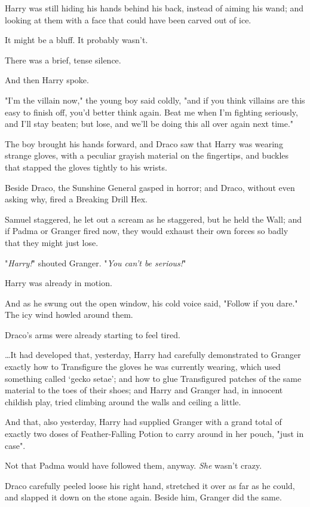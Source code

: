Harry was still hiding his hands behind his back, instead of aiming his wand; 
and looking at them with a face that could have been carved out of ice.

It might be a bluff. It probably wasn't.

There was a brief, tense silence.

And then Harry spoke.

"I'm the villain now," the young boy said coldly, "and if you think villains 
are this easy to finish off, you'd better think again. Beat me when I'm 
fighting seriously, and I'll stay beaten; but lose, and we'll be doing this all 
over again next time."

The boy brought his hands forward, and Draco saw that Harry was wearing strange 
gloves, with a peculiar grayish material on the fingertips, and buckles that 
stapped the gloves tightly to his wrists.

Beside Draco, the Sunshine General gasped in horror; and Draco, without even 
asking why, fired a Breaking Drill Hex.

Samuel staggered, he let out a scream as he staggered, but he held the Wall; 
and if Padma or Granger fired now, they would exhaust their own forces so badly 
that they might just lose.

"\emph{Harry!}" shouted Granger. "\emph{You can't be serious!}"

Harry was already in motion.

And as he swung out the open window, his cold voice said, "Follow if you dare."
\sbreak
The icy wind howled around them.

Draco's arms were already starting to feel tired.

{\ldots}It had developed that, yesterday, Harry had carefully demonstrated to 
Granger exactly how to Transfigure the gloves he was currently wearing, which 
used something called `gecko setae'; and how to glue Transfigured patches of 
the same material to the toes of their shoes; and Harry and Granger had, in 
innocent childish play, tried climbing around the walls and ceiling a little.

And that, also yesterday, Harry had supplied Granger with a grand total of 
exactly two doses of Feather-Falling Potion to carry around in her pouch, "just 
in case".

Not that Padma would have followed them, anyway. \emph{She} wasn't crazy.

Draco carefully peeled loose his right hand, stretched it over as far as he 
could, and slapped it down on the stone again. Beside him, Granger did the same.

